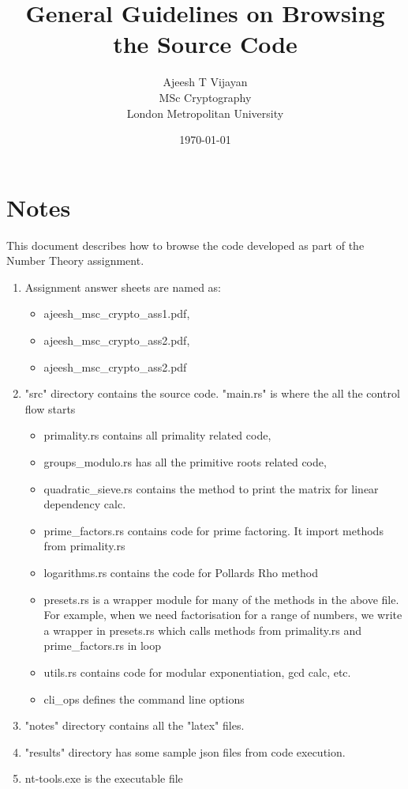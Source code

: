 \documentclass{article}
\title{General Guidelines on Browsing the Source Code}
\author{Ajeesh T Vijayan  \\
   MSc Cryptography  \\
   London Metropolitan University
}
\date{\today}
\begin{document}
    \maketitle

    \section*{Notes}
    This document describes how to browse the code developed as part of the
    Number Theory assignment.

    \begin{enumerate}
        \item Assignment answer sheets are named as:
            \begin{itemize}
                \item ajeesh\_msc\_crypto\_ass1.pdf,
                \item ajeesh\_msc\_crypto\_ass2.pdf,
                \item ajeesh\_msc\_crypto\_ass2.pdf
            \end{itemize}
        \item "src" directory contains the source code. "main.rs" is where the all the control flow starts
            \begin{itemize}
                \item primality.rs contains all primality related code,
                \item groups\_modulo.rs has all the primitive roots related code,
                \item quadratic\_sieve.rs contains the method to print the matrix for linear dependency calc.
                \item prime\_factors.rs contains code for prime factoring. It import methods from primality.rs
                \item logarithms.rs contains the code for Pollards Rho method
                \item presets.rs is a wrapper module for many of the methods in the above file. For example, when we need factorisation for a range of numbers, we write a wrapper in presets.rs which calls methods from primality.rs and prime\_factors.rs in loop
                \item utils.rs contains code for modular exponentiation, gcd calc, etc.
                \item cli\_ops defines the command line options
            \end{itemize}
        \item "notes" directory contains all the "latex" files.
        \item "results" directory has some sample json files from code execution.
        \item nt-tools.exe is the executable file
    \end{enumerate}
\end{document}

